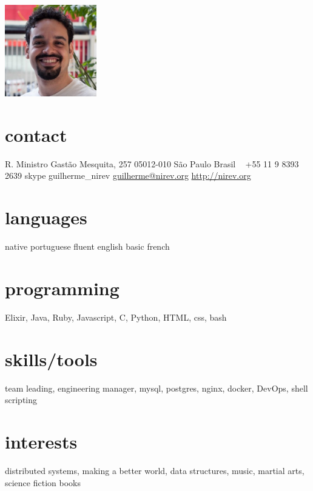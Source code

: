 \documentclass{friggeri-cv}
\begin{document}
       {}


\begin{aside}
  \includegraphics[width=4cm]{profile.jpg}
  \section{contact}
    R. Ministro Gastão Mesquita, 257
    05012-010 São Paulo
    Brasil
    ~
    +55 11 9 8393 2639
    {\footnotesize skype} guilherme\_nirev
    \href{mailto:guilherme@nirev.org}{guilherme@nirev.org}
    \href{http://nirev.org}{http://nirev.org}
  \section{languages}
    native portuguese
    fluent english
    basic french
  \section{programming}
    Elixir, Java, Ruby, Javascript, C, Python,
    HTML, css, bash
  \section{skills/tools}
    team leading, engineering manager,
    mysql, postgres,
    nginx, docker, DevOps,
    shell scripting
  \section{interests}
distributed systems, making a better world, data structures, music, martial arts, science fiction books
\end{aside}
\end{document}
